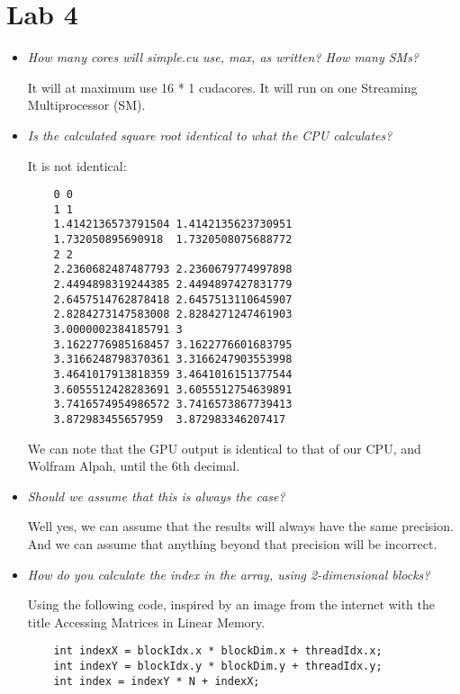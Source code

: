 \documentclass[a4paper,12pt]{article}
\begin{document}
\section{Lab 4}


\begin{itemize}
\item \textit{How many cores will simple.cu use, max, as written? How many SMs?}

  It will at maximum use 16 * 1 cudacores. It will run on one Streaming Multiprocessor (SM).

\item \textit{Is the calculated square root identical to what the CPU calculates?}

  It is not identical:

  \begin{lstlisting}
    0 0
    1 1
    1.4142136573791504 1.4142135623730951
    1.732050895690918  1.7320508075688772
    2 2
    2.2360682487487793 2.2360679774997898
    2.4494898319244385 2.4494897427831779
    2.6457514762878418 2.6457513110645907
    2.8284273147583008 2.8284271247461903
    3.0000002384185791 3
    3.1622776985168457 3.1622776601683795
    3.3166248798370361 3.3166247903553998
    3.4641017913818359 3.4641016151377544
    3.6055512428283691 3.6055512754639891
    3.7416574954986572 3.7416573867739413
    3.872983455657959  3.872983346207417
  \end{lstlisting}

  We can note that the GPU output is identical to that of our CPU, and Wolfram Alpah, until the 6th decimal.

\item \textit{Should we assume that this is always the case?}

  Well yes, we can assume that the results will always have the same precision. And we can assume that anything beyond that precision will be incorrect.

\item \textit{How do you calculate the index in the array, using 2-dimensional blocks?}

  Using the following code, inspired by an image from the internet with the title Accessing Matrices in Linear Memory.

  \begin{lstlisting}
    int indexX = blockIdx.x * blockDim.x + threadIdx.x;
    int indexY = blockIdx.y * blockDim.y + threadIdx.y;
    int index = indexY * N + indexX;
  \end{lstlisting}


\end{itemize}
\end{document}
